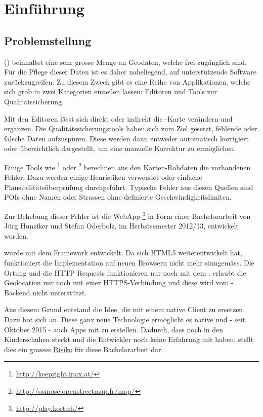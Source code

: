 \chapter{Einführung}
\label{tb-einfuehrung}

\section{Problemstellung}
 () beinhaltet eine sehr grosse Menge an Geodaten, welche frei zugänglich sind.
Für die Pflege dieser Daten ist es daher naheliegend, auf unterstützende Software zurückzugreifen.
Zu diesem Zweck gibt es eine Reihe von Applikationen, welche sich grob in zwei Kategorien einteilen lassen:
Editoren und Tools zur Qualitätssicherung.

Mit den Editoren lässt sich direkt oder indirekt die -Karte verändern und ergänzen.
Die Qualitätssicherungstools haben sich zum Ziel gesetzt, fehlende oder falsche Daten aufzuspüren.
Diese werden dann entweder automatisch korrigiert oder übersichtlich dargestellt, um eine manuelle Korrektur zu ermöglichen.

Einige Tools wie \footnote{\url{http://keepright.ipax.at/}} oder \footnote{\url{http://osmose.openstreetmap.fr/map/}} berechnen aus den Karten-Rohdaten die vorhandenen Fehler.
Dazu werden einige Heuristiken verwendet oder einfache Plausibilitätsüberprüfung durchgeführt.
Typische Fehler aus diesen Quellen sind \glspl{POI} ohne Namen oder Strassen ohne definierte Geschwindigkeitslimiten.\cite{ba-kort-2012}

Zur Behebung dieser Fehler ist die \gls{WebApp} \kort{}\footnote{\url{http://play.kort.ch/}} in Form einer Bachelorarbeit von Jürg Hunziker und Stefan Oderbolz, im Herbstsemester 2012/13, entwickelt  worden.

\kort{} wurde mit dem  \gls{Framework} entwickelt.
Da sich HTML5 weiterentwickelt hat, funktioniert die Implementation auf neuen Browsern nicht mehr sinngemäss.
Die Ortung und die HTTP Requests funktionieren nur noch mit dem .
 erlaubt die Geolocation nur noch mit einer HTTPS-Verbindung und diese wird vom \kort{}-Backend nicht unterstützt.

Aus diesem Grund entstand die Idee, die \kort{} mit einem native Client zu ersetzen.
Dazu bot sich  an. 
Diese ganz neue Technologie ermöglicht es native  und - seit Oktober 2015 - auch  Apps mit  zu erstellen. 
Dadurch, dass  noch in den Kinderschuhen steckt und die Entwickler noch keine Erfahrung mit  haben, stellt dies ein grosses \hyperref[pm-projektmanagement-risikomanagement]{Risiko} für diese Bachelorarbeit dar.


